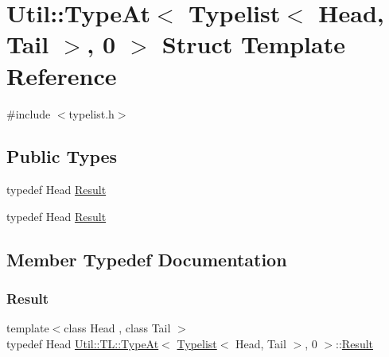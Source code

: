 \hypertarget{structUtil_1_1TL_1_1TypeAt_3_01Typelist_3_01Head_00_01Tail_01_4_00_010_01_4}{}\section{Util\+:\+:Type\+At$<$ Typelist$<$ Head, Tail $>$, 0 $>$ Struct Template Reference}
\label{structUtil_1_1TL_1_1TypeAt_3_01Typelist_3_01Head_00_01Tail_01_4_00_010_01_4}


{\ttfamily \#include $<$typelist.\+h$>$}

\subsection*{Public Types}
\begin{DoxyCompactItemize}
\item 
typedef Head \mbox{\hyperlink{structUtil_1_1TL_1_1TypeAt_3_01Typelist_3_01Head_00_01Tail_01_4_00_010_01_4_a3e1d7aaa0069c4e96cbb6bbc823fa9e8}{Result}}
\item 
typedef Head \mbox{\hyperlink{structUtil_1_1TL_1_1TypeAt_3_01Typelist_3_01Head_00_01Tail_01_4_00_010_01_4_a3e1d7aaa0069c4e96cbb6bbc823fa9e8}{Result}}
\end{DoxyCompactItemize}


\subsection{Member Typedef Documentation}
\mbox{\label{structUtil_1_1TL_1_1TypeAt_3_01Typelist_3_01Head_00_01Tail_01_4_00_010_01_4_a3e1d7aaa0069c4e96cbb6bbc823fa9e8}} 
\subsubsection{\texorpdfstring{Result}{Result}\hspace{0.1cm}{\footnotesize\ttfamily [1/2]}}
{\footnotesize\ttfamily template$<$class Head , class Tail $>$ \\
typedef Head \mbox{\hyperlink{structUtil_1_1TL_1_1TypeAt}{Util\+::\+T\+L\+::\+Type\+At}}$<$ \mbox{\hyperlink{structUtil_1_1Typelist}{Typelist}}$<$ Head, Tail $>$, 0 $>$\+::\mbox{\hyperlink{structUtil_1_1TL_1_1TypeAt_3_01Typelist_3_01Head_00_01Tail_01_4_00_010_01_4_a3e1d7aaa0069c4e96cbb6bbc823fa9e8}{Result}}}


